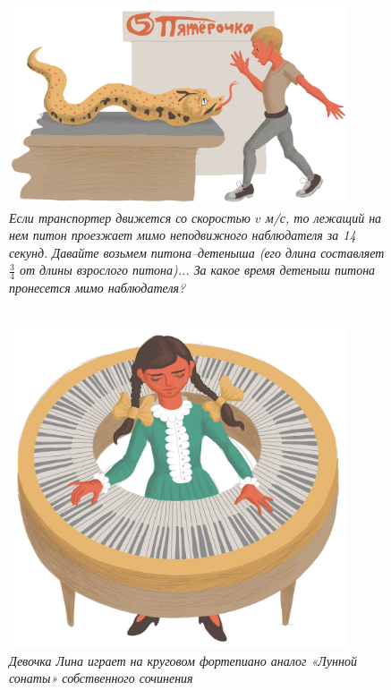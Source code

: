 \documentclass[10pt]{scrbook} \usepackage{modules/nonstahp_book}
\begin{document}
\begin{figure} \begin{center}
	\includegraphics[width=10cm]{figures/color/04c.jpg}
	\vspace{1cm}
	\caption{
             {\itshape  Если транспортер движется со скоростью $v$ м/с, то лежащий 
             на нем питон проезжает мимо неподвижного наблюдателя за 14 секунд. 
             Давайте возьмем питона–детеныша (его длина составляет $\tfrac{3}{4}$ от 
             длины взрослого питона)... %
             За какое время детеныш питона пронесется мимо наблюдателя? }\medskip\\
             \\
             }
\end{center} \end{figure}

\vfill\eject

\begin{figure} \begin{center}
	\includegraphics[width=10cm]{figures/color/06c.jpg}
	\vspace{1cm}
	\caption{
             {\itshape  Девочка Лина играет на круговом фортепиано аналог 
              «Лунной сонаты» собственного сочинения }\medskip\\
             \\
             }
\end{center} \end{figure}
\end{document}
